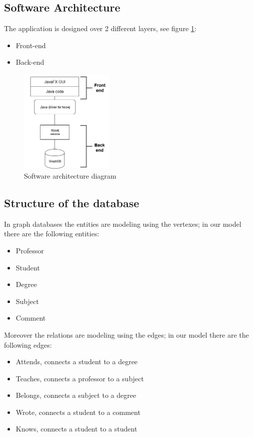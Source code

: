 \documentclass[a4paper]{article}
\begin{document}
\subsection{Software Architecture}
The application is designed over 2 different layers, see figure \ref{fig:architecture_diagram}:
\begin{itemize}
\item Front-end
\item Back-end
\end{itemize}
\begin{figure}[h]
\centering
\includegraphics[width=0.4\textwidth]{./images/diagrams/architecture_diagram.png} 
\caption{Software architecture diagram\\}
\label{fig:architecture_diagram}
\end{figure}

\subsection{Structure of the database}
In graph databases the entities are modeling using the vertexes; in our model there are the following entities:
\begin{itemize}
\item Professor
\item Student
\item Degree
\item Subject
\item Comment
\end{itemize}
Moreover the relations are modeling using the edges; in our model there are the following edges:
\begin{itemize}
\item Attends, connects a student to a degree
\item Teaches, connects a professor to a subject
\item Belongs, connects a subject to a degree
\item Wrote, connects a student to a comment
\item Knows, connects a student to a student
\end{itemize}
\end{document}
